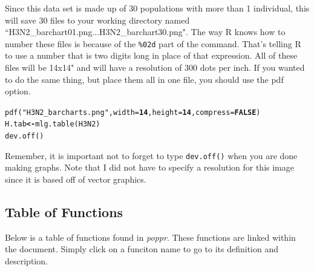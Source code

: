\documentclass[letterpaper]{article}\usepackage[]{graphicx}\usepackage[]{color}
\makeatletter
\newcommand{\hlnum}[1]{\textcolor[rgb]{0.502,0,0.502}{\textbf{#1}}}%
\newcommand{\hlstr}[1]{\textcolor[rgb]{0.651,0.522,0}{#1}}%
\newcommand{\hlstd}[1]{\textcolor[rgb]{0,0,0}{#1}}%
\newcommand{\hlkwb}[1]{\textcolor[rgb]{0.502,0.502,0.753}{\textbf{#1}}}%
\newcommand{\hlkwc}[1]{\textcolor[rgb]{0,0.502,0.753}{#1}}%
\newcommand{\hlkwd}[1]{\textcolor[rgb]{0,0.267,0.4}{#1}}%
\newenvironment{kframe}{%
 \def\at@end@of@kframe{}%
 \ifinner\ifhmode%
  \def\at@end@of@kframe{\end{minipage}}%
  \begin{minipage}{\columnwidth}%
 \fi\fi%
 \def\FrameCommand##1{\hskip\@totalleftmargin \hskip-\fboxsep
 \colorbox{shadecolor}{##1}\hskip-\fboxsep
     \hskip-\linewidth \hskip-\@totalleftmargin \hskip\columnwidth}%
 \MakeFramed {\advance\hsize-\width
   \@totalleftmargin\z@ \linewidth\hsize
   \@setminipage}}%
 {\par\unskip\endMakeFramed%
 \at@end@of@kframe}
\newenvironment{knitrout}{}{} %
\newcommand{\tab}{\hspace*{1em}}
\makeatother
\begin{document}
Since this data set is made up of 30 populations with more than 1 individual, this will save 30 files to your working directory named ``H3N2\_barchart01.png...H3N2\_barchart30.png". The way R knows how to number these files is because of the \texttt{\%02d} part of the command. That's telling R to use a number that is two digits long in place of that expression. All of these files will be 14x14" and will have a resolution of 300 dots per inch. If you wanted to do the same thing, but place them all in one file, you should use the pdf option.

\begin{knitrout}\footnotesize
{}\color{fgcolor}\begin{kframe}
\begin{alltt}
\hlkwd{pdf}\hlstd{(}\hlstr{"H3N2_barcharts.png"}\hlstd{,} \hlkwc{width} \hlstd{=} \hlnum{14}\hlstd{,} \hlkwc{height} \hlstd{=} \hlnum{14}\hlstd{,} \hlkwc{compress} \hlstd{=} \hlnum{FALSE}\hlstd{)}
\hlstd{H.tab} \hlkwb{<-} \hlkwd{mlg.table}\hlstd{(H3N2)}
\hlkwd{dev.off}\hlstd{()}
\end{alltt}
\end{kframe}
\end{knitrout}


Remember, it is important not to forget to type \texttt{dev.off()} when you are done making graphs. Note that I did not have to specify a resolution for this image since it is based off of vector graphics.

\subsection{Table of Functions}\label{appendix:funk}

\tab\tab Below is a table of functions found in \textit{poppr}. These functions are
linked within the document. Simply click on a funciton name to go to its definition 
and description. 
\end{document}
